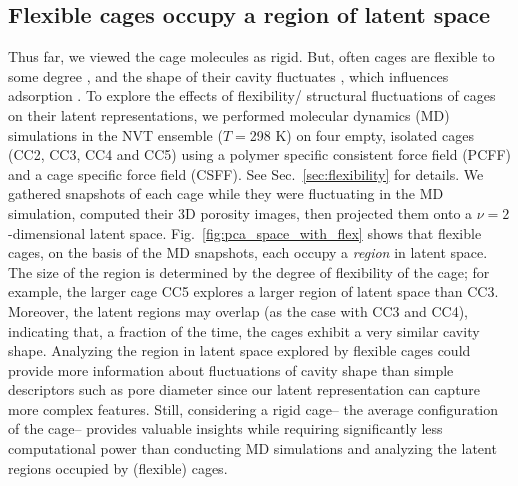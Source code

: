 \documentclass[journal=jacsat,manuscript=article,layout=traditional]{achemso}
\begin{document}
\subsection{\color{red} Flexible cages occupy a region of latent space}
\label{sec:flexible_MD}
{\color{red}Thus far, we viewed the cage molecules as rigid. But, often cages are flexible to some degree \cite{chen2014separation,camp2016transition,holden2014gas,holden2016understanding}, and the shape of their cavity fluctuates \cite{chen2014separation}, which influences adsorption \cite{witman2017influence}.
To explore the effects of flexibility/ structural fluctuations of cages on their latent representations, we performed molecular dynamics (MD) simulations in the NVT ensemble ($T=$298 K) on four empty, isolated cages (CC2, CC3, CC4 and CC5) using a polymer specific consistent force field (PCFF)\cite{sun1998compass} and a cage specific force field (CSFF)\cite{holden2012bespoke}. See Sec.~\ref{sec:flexibility} for details. We gathered snapshots of each cage while they were fluctuating in the MD simulation, computed their 3D porosity images, then projected them onto a $\nu=2$-dimensional latent space. Fig.~\ref{fig:pca_space_with_flex} shows that flexible cages, on the basis of the MD snapshots, each occupy a \emph{region} in latent space. The size of the region is determined by the degree of flexibility of the cage; for example, the larger cage CC5 explores a larger region of latent space than CC3. Moreover, the latent regions may overlap (as the case with CC3 and CC4), indicating that, a fraction of the time, the cages exhibit a very similar cavity shape. 
Analyzing the region in latent space explored by flexible cages could provide more information about fluctuations of cavity shape than simple descriptors such as pore diameter since our latent representation can capture more complex features. Still, considering a rigid cage-- the average configuration of the cage-- provides valuable insights while requiring significantly less computational power than conducting MD simulations and analyzing the latent regions occupied by (flexible) cages.
}
\end{document}
